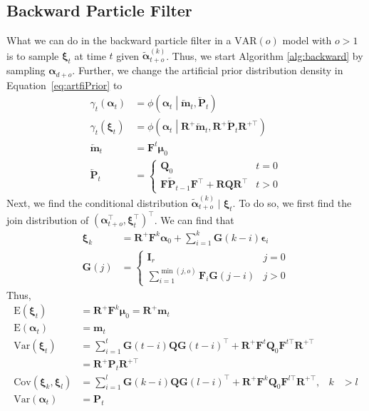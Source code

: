 \documentclass[notitlepage]{article}
\renewcommand{\vec}[1]{\bm{#1}}
\newcommand{\vecLarrow}[1]{\overleftarrow{\vec{#1}}}
\newcommand{\mat}[1]{\mathbf{#1}}
\newcommand{\matLarrow}[1]{\overleftarrow{\mat{#1}}}
\newcommand{\Lparen}[1]{\left( #1\right)}
\newcommand{\Cond}[2]{ #1 \middle\vert  #2}
\newcommand{\VAR}{\text{Var}}
\newcommand{\E}{\text{E}}
\newcommand{\COV}{\text{Cov}}
\newcommand{\optor}[2]{#1\Lparen{#2}}
\newcommand{\optorC}[3]{\optor{#1}{\Cond{#2}{#3}}}
\newcommand{\expec}[1]{\optor{\E}{#1}}
\newcommand{\varp}[1]{\optor{\VAR}{#1}}
\newcommand{\covp}[1]{\optor{\COV}{#1}}
\newcommand{\normaldC}[3]{\optorC{\phi}{#1}{#2,#3}}
\newcommand{\particB}[3]{\widetilde{#1}_{#2}^{\Lparen{#3}}}
\newcommand{\dimRng}{r}
\newcommand\MVAR[1]{\optor{\text{VAR}}{#1}}
\begin{document}
\subsection{Backward Particle Filter}
What we can do in the backward particle filter in a $\MVAR{o}$ model with $o > 1$ is to 
sample $\vec\xi_t$ at 
time $t$ given $\particB{\vec\alpha}{t + o}k$. Thus, we start Algorithm \ref{alg:backward} by 
sampling $\vec\alpha_{d + o}$. 
Further, we change the artificial 
prior distribution density in Equation~\eqref{eq:artfiPrior} to %
%
\begin{align*}
	\gamma_t\Lparen{\vec{\alpha}_t} &=
		\normaldC{\vec{\alpha}_t}{\vecLarrow{m}_t}{\matLarrow{P}_t} \\
	\gamma_t\Lparen{\vec\xi_t} &= 
		\normaldC{\vec{\alpha}_t}{\mat R^+\vecLarrow{m}_t}{
			\mat R^+\matLarrow{P}_t\mat R^{+\top}} \\
%
	\vecLarrow{m}_t &= \mat{F}^t\vec\mu_0 \\
%
	\matLarrow{P}_t &= \left\{
		\begin{matrix} \mat{Q}_0 & t = 0 \\ \mat{F}\matLarrow{P}_{t - 1}\mat{F}^\top + 
		\mat R\mat Q\mat R^\top & t > 0   \end{matrix} \right.
\end{align*}%
%
Next, we find the conditional distribution $\particB{\vec\alpha}{t + o}k \mid \vec\xi_t$. 
To do so, we first find the join distribution of %
$(\vec \alpha_{t + o}^\top, \vec \xi_t^\top)^\top$.  We can find that%
%
\begin{align*}
\vec\xi_k &= 
	\mat R^+\mat F^k \vec\alpha_0 + \sum_{i = 1}^k \mat G(k - i) \vec\epsilon_i \\
\mat G(j) &= \left\{ \begin{matrix}
	\mat I_\dimRng & j = 0 \\
	\sum_{i = 1}^{\min (j, o)} \mat F_i \mat G(j - i) & j > 0
\end{matrix}\right.
\end{align*}
% 
Thus, %
%
\begin{align*}
\expec{\vec\xi_t} &= \mat R^+\mat F^k\vec\mu_0 = \mat R^+\vec m_t \\
\expec{\vec\alpha_t} &= \vec m_t \\
\varp{\vec\xi_t} &= \sum_{i = 1}^t \mat G(t - i) \mat Q \mat G(t - i)^\top + 
	\mat R^+\mat F^t\mat Q_0 \mat F^{t\top}\mat R^{+\top} \\ 
	&= \mat R^+\mat P_t \mat R^{+\top} \\
\covp{\vec\xi_k, \vec\xi_l} &= 
	\sum_{i = 1}^l\mat G(k - i)\mat Q \mat G(l - i)^\top
	+ \mat R^+\mat F^k\mat Q_0\mat F^{l\top}\mat R^{+\top}, 
	& k &> l \\
\varp{\vec\alpha_t} &= \mat P_t 
\end{align*}%
\end{document}
